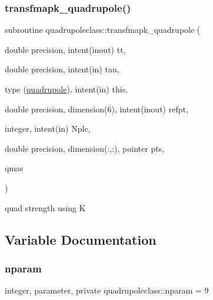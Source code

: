 \subsubsection{\texorpdfstring{transfmapk\_quadrupole()}{transfmapk\_quadrupole()}}
{\footnotesize\ttfamily subroutine quadrupoleclass\+::transfmapk\+\_\+quadrupole (\begin{DoxyParamCaption}\item[{double precision, intent(inout)}]{tt,  }\item[{double precision, intent(in)}]{tau,  }\item[{type (\mbox{\hyperlink{namespacequadrupoleclass_structquadrupoleclass_1_1quadrupole}{quadrupole}}), intent(in)}]{this,  }\item[{double precision, dimension(6), intent(inout)}]{refpt,  }\item[{integer, intent(in)}]{Nplc,  }\item[{double precision, dimension(\+:,\+:), pointer}]{pts,  }\item[{}]{qmas }\end{DoxyParamCaption})}



quad strength using K 



\subsection{Variable Documentation}
\mbox{\label{namespacequadrupoleclass_a8eba81bd9796e431c21d0f46260b0c6c}} 
\subsubsection{\texorpdfstring{nparam}{nparam}}
{\footnotesize\ttfamily integer, parameter, private quadrupoleclass\+::nparam = 9\hspace{0.3cm}{\ttfamily [private]}}

